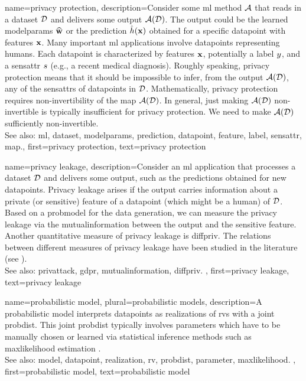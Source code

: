 {name={privacy protection},
     description={Consider some \gls{ml} method $\mathcal{A}$ that reads 
	 	in a \gls{dataset} $\mathcal{D}$ and delivers some output $\mathcal{A}(\mathcal{D})$. The output 
	 	could be the learned \gls{modelparams} $\widehat{{\bf w}}$ or the \gls{prediction} 
	 	$\hat{h}({\bf x})$ obtained for a specific \gls{datapoint} with \glspl{feature} 
	 	${\bf x}$. Many important \gls{ml} applications involve \glspl{datapoint} 
		representing humans. Each \gls{datapoint} is characterized by \glspl{feature} ${\bf x}$, 
		potentially a \gls{label} $y$, and a \gls{sensattr} $s$ (e.g., a recent medical diagnosis). 
		Roughly speaking, privacy protection means that it should be impossible to infer, from the output $\mathcal{A}(\mathcal{D})$, 
		any of the \glspl{sensattr} of \glspl{datapoint} in $\mathcal{D}$. Mathematically, privacy protection requires non-invertibility 
		of the \gls{map} $\mathcal{A}(\mathcal{D})$. In general, just making $\mathcal{A}(\mathcal{D})$ non-invertible 
		is typically insufficient for privacy protection. We need to make $\mathcal{A}(\mathcal{D})$ sufficiently non-invertible. 
					\\ 
		See also: \gls{ml}, \gls{dataset}, \gls{modelparams}, \gls{prediction}, \gls{datapoint}, \gls{feature}, \gls{label}, \gls{sensattr}, \gls{map}.}, 
	first={privacy protection}, 
	text={privacy protection} 
}

{name={privacy leakage},
	description={Consider an \gls{ml} application that processes a 
		\gls{dataset} $\mathcal{D}$ and delivers some output, such as the \glspl{prediction} 
		obtained for new \glspl{datapoint}. Privacy leakage arises 
		if the output carries information about a private (or sensitive) \gls{feature} of 
		a \gls{datapoint} (which might be a human) of $\mathcal{D}$. Based on a \gls{probmodel} 
		for the \gls{data} generation, we can measure the privacy leakage via the \gls{mutualinformation} 
		between the output and the sensitive \gls{feature}. Another quantitative measure of privacy leakage 
		is \gls{diffpriv}. The relations between different measures of privacy leakage have been 
		studied in the literature (see \cite{InfThDiffPriv}). 
				\\ 
		See also: \gls{privattack}, \gls{gdpr}, \gls{mutualinformation}, \gls{diffpriv}. }, 
	first={privacy leakage}, 
	text={privacy leakage} 
}


{name={probabilistic model}, plural={probabilistic models},
	description={A probabilistic \gls{model} interprets \glspl{datapoint} 
		as \glspl{realization} of \glspl{rv} with a joint \gls{probdist}. This joint \gls{probdist} typically 
		involves \glspl{parameter} which have to be manually chosen or learned via statistical inference 
		methods such as \gls{maxlikelihood} estimation \cite{LC}.
					\\ 
		See also: \gls{model}, \gls{datapoint}, \gls{realization}, \gls{rv}, \gls{probdist}, \gls{parameter}, \gls{maxlikelihood}. }, 
	first={probabilistic model}, 
	text={probabilistic model} 
}


